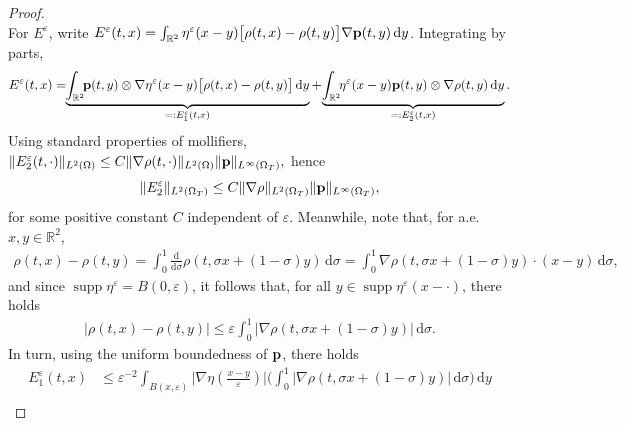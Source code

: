 \documentclass[10pt,a4paper]{amsart}
\newcommand{\RR}{\mathbb{R}}
\renewcommand{\d}{\, \mathrm{d} }
\newcommand{\der}{\mathrm{d}}
\newcommand{\p}{{\bf p}}
\DeclareMathOperator{\supp}{\mathrm{supp}}
\begin{document}
\begin{proof}
\begin{equation}
\end{equation}
For $E^\varepsilon$, write $E^\varepsilon(t,x) = \int_{\mathbb{R}^2} \eta^\varepsilon(x-y)\big[ \rho(t,x)-\rho(t,y) \big]\nabla\p(t,y) \d y$. Integrating by parts, 
\begin{equation*}
   \begin{aligned}
       E^\varepsilon(t,x) =\!\!  \underbrace{\int_{\mathbb{R}^2} \!\!\p(t,y) \otimes \nabla \eta^\varepsilon(x-y) \big[ \rho(t,x)-\rho(t,y) \big] \d y}_{=: E^\varepsilon_1(t,x)} + \!\underbrace{\int_{\mathbb{R}^2} \!\!\eta^\varepsilon(x-y) \p(t,y) \otimes \nabla \rho(t,y) \d y}_{=: E^\varepsilon_2(t,x)} . 
   \end{aligned} 
\end{equation*}
Using standard properties of mollifiers, $\Vert E^\varepsilon_2(t,\cdot) \Vert_{L^2(\Omega)} \leq C \Vert \nabla \rho(t,\cdot) \Vert_{L^2(\Omega)} \Vert \p \Vert_{L^\infty(\Omega_T)},$ hence 
\begin{equation}\label{eq:Eeps2 bound unif}
    \Vert E^\varepsilon_2 \Vert_{L^2(\Omega_T)} \leq C \Vert \nabla \rho \Vert_{L^2(\Omega_T)} \Vert \p \Vert_{L^\infty(\Omega_T)}, 
\end{equation}
for some positive constant $C$ independent of $\varepsilon$. Meanwhile, note that, for a.e.~$x,y\in \RR^2$,
\begin{equation*}
   \begin{aligned} 
  \rho(t,x)-\rho(t,y) = \int_0^1 \frac{\der}{\der \sigma}\rho(t,\sigma x +(1-\sigma)y)  \d \sigma = \int_0^1 \nabla \rho(t,\sigma x +(1-\sigma)y) \!\cdot\! (x-y)  \d \sigma, 
   \end{aligned}
\end{equation*}
and since $\supp \eta^\varepsilon = B(0,\varepsilon)$, it follows that, for all $y \in \supp \eta^\varepsilon(x-\cdot)$, there holds 
\begin{equation}\label{eq:rho diff for mollification argument}
   \begin{aligned} 
  |\rho(t,x)-\rho(t,y)| \leq \varepsilon \int_0^1 |\nabla \rho(t,\sigma x +(1-\sigma)y)| \d \sigma. 
   \end{aligned}
\end{equation}
In turn, using the uniform boundedness of $\p$, there holds 
\begin{equation*}
    \begin{aligned}
        E^\varepsilon_1(t,x) &\leq \varepsilon^{-2} \int_{B(x,\varepsilon)} \big|\nabla \eta(\frac{x-y}{\varepsilon}) \big| \bigg(  \int_0^1 |\nabla \rho(t,\sigma x +(1-\sigma)y)| \d \sigma\bigg) \d y \\ 

\end{aligned}
\end{equation*}
\end{proof}
\end{document}
